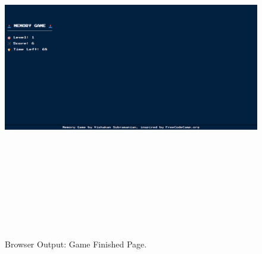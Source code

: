 \documentclass[12pt, a4]{article}
\begin{document}
\subsection*{}
\begin{figure}[h]
\centering
\caption{Browser Output: Game Finished Page.}
\includegraphics[height=15cm, width=18cm]{Output/GameFin.png}
\end{figure}

\newpage
\end{document}
